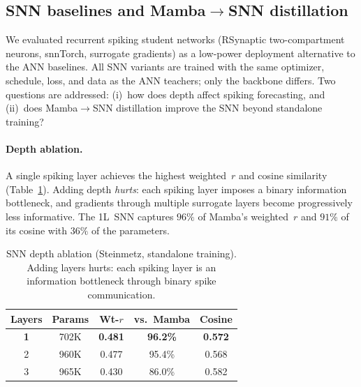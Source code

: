 \documentclass{article}
\begin{document}
\subsection{SNN baselines and Mamba$\to$SNN distillation}
\label{app:snn-distill}

We evaluated recurrent spiking student networks (RSynaptic two-compartment
neurons, snnTorch, surrogate gradients) as a low-power deployment
alternative to the ANN baselines.  All SNN variants are trained with the
same optimizer, schedule, loss, and data as the ANN teachers; only the
backbone differs.  Two questions are addressed: (i)~how does depth
affect spiking forecasting, and (ii)~does Mamba$\to$SNN distillation
improve the SNN beyond standalone training?

\paragraph{Depth ablation.}
A single spiking layer achieves the highest weighted~$r$ and cosine
similarity (Table~\ref{tab:depth}).  Adding depth \emph{hurts}: each
spiking layer imposes a binary information bottleneck, and gradients
through multiple surrogate layers become progressively less informative.
The 1L~SNN captures $96\%$ of Mamba's weighted~$r$ and $91\%$ of its
cosine with $36\%$ of the parameters.

\begin{table}[h]
  \caption{SNN depth ablation (Steinmetz, standalone training).
    Adding layers hurts: each spiking layer is an information
    bottleneck through binary spike communication.}
  \label{tab:depth}
  \centering
  \small
  \begin{tabular}{@{} c c c c c @{}}
    \toprule
    \textbf{Layers} & \textbf{Params} & \textbf{Wt-$r$}
      & \textbf{vs.\ Mamba} & \textbf{Cosine} \\
    \midrule
    \textbf{1} & 702K  & \textbf{0.481} & \textbf{96.2\%} & \textbf{0.572} \\
    2           & 960K  & 0.477 & 95.4\% & 0.568 \\
    3           & 965K  & 0.430 & 86.0\% & 0.582 \\
    \bottomrule
  \end{tabular}
\end{table}
\end{document}
